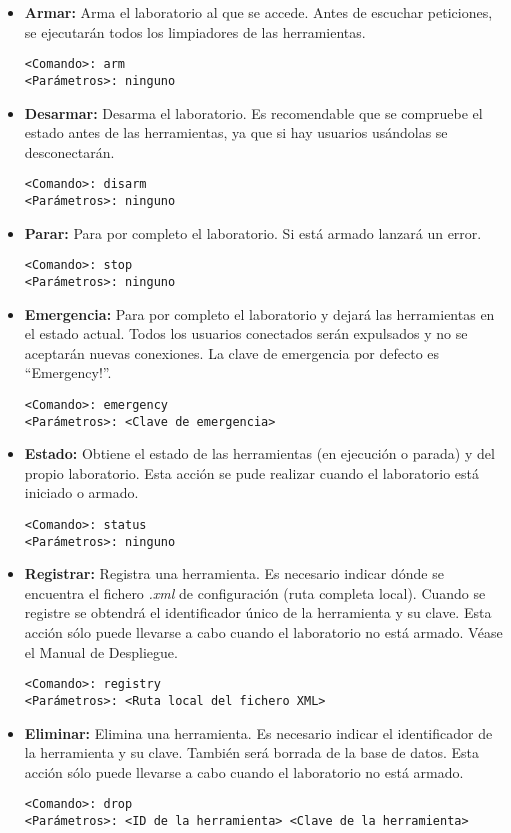 \begin{itemize}
\item \textbf{Armar:} Arma el laboratorio al que se accede. Antes de 
escuchar peticiones, se ejecutarán todos los limpiadores de las 
herramientas.
\begin{verbatim}
<Comando>: arm
<Parámetros>: ninguno
\end{verbatim}
\item \textbf{Desarmar:} Desarma el laboratorio. Es recomendable que 
se compruebe el estado antes de las herramientas, ya que si hay 
usuarios usándolas se desconectarán.
\begin{verbatim}
<Comando>: disarm
<Parámetros>: ninguno
\end{verbatim}
\item \textbf{Parar:} Para por completo el laboratorio. Si está armado 
lanzará un error.
\begin{verbatim}
<Comando>: stop
<Parámetros>: ninguno
\end{verbatim}
\item \textbf{Emergencia:} Para por completo el laboratorio y dejará 
las herramientas en el estado actual. Todos los usuarios conectados 
serán expulsados y no se aceptarán nuevas conexiones. La clave de 
emergencia por defecto es ``Emergency!''.
\begin{verbatim}
<Comando>: emergency
<Parámetros>: <Clave de emergencia>
\end{verbatim}
\item \textbf{Estado:} Obtiene el estado de las herramientas (en 
ejecución o parada) y del propio laboratorio. Esta acción se pude 
realizar cuando el laboratorio está iniciado o armado.
\begin{verbatim}
<Comando>: status
<Parámetros>: ninguno
\end{verbatim}
\item \textbf{Registrar:} Registra una herramienta. Es necesario 
indicar dónde se encuentra el fichero \emph{.xml} de configuración 
(ruta completa local). Cuando se registre se obtendrá el identificador 
único de la herramienta y su clave. Esta acción sólo puede llevarse 
a cabo cuando el laboratorio no está armado. Véase el Manual de Despliegue.
\begin{verbatim}
<Comando>: registry
<Parámetros>: <Ruta local del fichero XML>
\end{verbatim}
\item \textbf{Eliminar:} Elimina una herramienta. Es necesario 
indicar el identificador de la herramienta y su clave. También será 
borrada de la base de datos. Esta acción sólo puede llevarse a cabo 
cuando el laboratorio no está armado.
\begin{verbatim}
<Comando>: drop
<Parámetros>: <ID de la herramienta> <Clave de la herramienta>
\end{verbatim}
\end{itemize}


